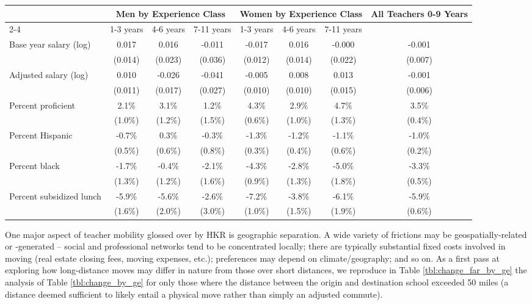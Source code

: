 \documentclass[12pt,]{article}
\begin{document}
\begin{sidewaystable}[htbp]
\centering
\begin{tabular}{lccccccc}
  \hline
 & \multicolumn{3}{c}{Men by Experience Class} & \multicolumn{3}{c}{Women by Experience Class} & \multirow{2}{*}{\parbox{0.1\linewidth}{All Teachers 0-9 Years}}\\ \cline{2-4} \cline{5-7}
 & 1-3 years & 4-6 years & 7-11 years & 1-3 years & 4-6 years & 7-11 years &  \\ 
  \hline
Base year salary (log) & 0.017 & 0.016 & -0.011 & -0.017 & 0.016 & -0.000 & -0.001 \\ 
   & (0.014) & (0.023) & (0.036) & (0.012) & (0.014) & (0.022) & (0.007) \\ 
  Adjusted salary (log) & 0.010 & -0.026 & -0.041 & -0.005 & 0.008 & 0.013 & -0.001 \\ 
   & (0.011) & (0.017) & (0.027) & (0.010) & (0.010) & (0.015) & (0.006) \\ 
  Percent proficient & 2.1\% & 3.1\% & 1.2\% & 4.3\% & 2.9\% & 4.7\% & 3.5\% \\ 
   & (1.0\%) & (1.2\%) & (1.5\%) & (0.6\%) & (1.0\%) & (1.3\%) & (0.4\%) \\ 
  Percent Hispanic & -0.7\% & 0.3\% & -0.3\% & -1.3\% & -1.2\% & -1.1\% & -1.0\% \\ 
   & (0.5\%) & (0.6\%) & (0.8\%) & (0.3\%) & (0.4\%) & (0.6\%) & (0.2\%) \\ 
  Percent black & -1.7\% & -0.4\% & -2.1\% & -4.3\% & -2.8\% & -5.0\% & -3.3\% \\ 
   & (1.3\%) & (1.2\%) & (1.6\%) & (0.9\%) & (1.3\%) & (1.8\%) & (0.5\%) \\ 
  Percent subsidized lunch & -5.9\% & -5.6\% & -2.6\% & -7.2\% & -3.8\% & -6.1\% & -5.9\% \\ 
   & (1.6\%) & (2.0\%) & (3.0\%) & (1.0\%) & (1.5\%) & (1.9\%) & (0.6\%) \\ 
   \hline
\end{tabular}
\caption{Average Change in Salary and District Student Characteristics (and Standard Deviations) for Teachers Changing to a district more than 50 Miles Away, by Gender and Experience} 
\label{tbl:change_far_by_ge}
\end{sidewaystable}

One major aspect of teacher mobility glossed over by HKR is geographic
separation. A wide variety of frictions may be geospatially-related or
-generated -- social and professional networks tend to be concentrated
locally; there are typically substantial fixed costs involved in moving
(real estate closing fees, moving expenses, etc.); preferences may
depend on climate/geography; and so on. As a first pass at exploring how
long-distance moves may differ in nature from those over short
distances, we reproduce in Table \ref{tbl:change_far_by_ge} the analysis
of Table \ref{tbl:change_by_ge} for only those where the distance
between the origin and destination school exceeded 50 miles (a distance
deemed sufficient to likely entail a physical move rather than simply an
adjusted commute).
\end{document}
